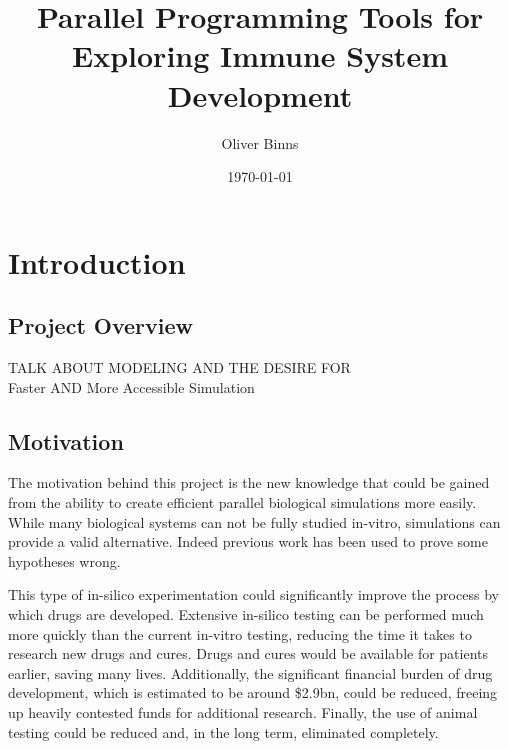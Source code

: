 \documentclass{UoYCSproject}
\title{Parallel Programming Tools for Exploring Immune System Development}
\author{Oliver Binns}
\date{\today}
\begin{document}
\maketitle
\listoffigures
\listoftables
\printglossary[type=\acronymtype]
\printglossary


\chapter{Introduction}
\section{Project Overview}
TALK ABOUT MODELING AND THE DESIRE FOR 
\\
Faster AND More Accessible Simulation

\section{Motivation}
The motivation behind this project is the new knowledge that could be gained from the ability to create efficient parallel biological simulations more easily.
While many biological systems can not be fully studied \gls{in-vitro}, simulations can provide a valid alternative.
Indeed previous work has been used to prove some hypotheses wrong.

This type of \gls{in-silico} experimentation could significantly improve the process by which drugs are developed.
Extensive \gls{in-silico} testing can be performed much more quickly than the current \gls{in-vitro} testing, reducing the time it takes to research new drugs and cures.
Drugs and cures would be available for patients earlier, saving many lives.
Additionally, the significant financial burden of drug development, which is estimated to be around \$2.9bn\cite{drug_cost}, could be reduced, freeing up heavily contested funds for additional research.
Finally, the use of animal testing could be reduced and, in the long term, eliminated completely.
\end{document}
